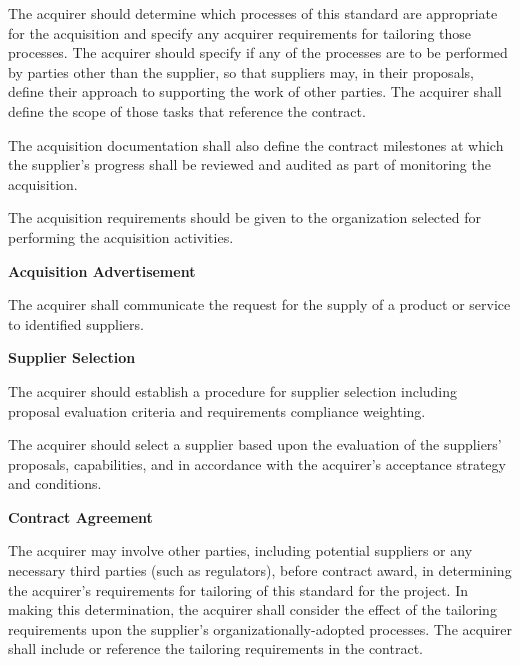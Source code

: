 \begin{adjustwidth}{2em}{0pt}
\begin{compactenum}
\begin{compactenum}
						\item The acquirer should determine which processes of this standard are appropriate for the acquisition and specify any acquirer requirements for tailoring those processes. The acquirer should specify if any of the processes are to be performed by parties other than the supplier, so that suppliers may, in their proposals, define their approach to supporting the work of other parties. The acquirer shall define the scope of those tasks that reference the contract.

						\item The acquisition documentation shall also define the contract milestones at which the supplier's progress shall be reviewed and audited as part of monitoring the acquisition.

						\item The acquisition requirements should be given to the organization selected for performing the acquisition activities.
					\end{compactenum}

					\item {\bf Acquisition Advertisement}
					\begin{compactenum}
						\item The acquirer shall communicate the request for the supply of a product or service to identified suppliers. 
					\end{compactenum}

					\item {\bf Supplier Selection}
					\begin{compactenum}
						\item The acquirer should establish a procedure for supplier selection including proposal evaluation criteria and requirements compliance weighting.

						\item The acquirer should select a supplier based upon the evaluation of the suppliers' proposals, capabilities, and in accordance with the acquirer's acceptance strategy and conditions.
					\end{compactenum}

					\item {\bf Contract Agreement}
					\begin{compactenum}
						\item The acquirer may involve other parties, including potential suppliers or any necessary third parties (such as regulators), before contract award, in determining the acquirer's requirements for tailoring of this standard for the project. In making this determination, the acquirer shall consider the effect of the tailoring requirements upon the supplier's organizationally-adopted processes. The acquirer shall include or reference the tailoring requirements in the contract.


\end{compactenum}
\end{compactenum}
\end{adjustwidth}
